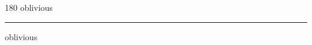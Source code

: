 
\begin{frame}
\begin{center}
\begin{turn}{180}
{\fontsize{2.5cm}{1em}\selectfont oblivious}
\end{turn}
\vspace{1em}\par  
\hrule
\vspace{1em}\par  
{\fontsize{2.5cm}{1em}\selectfont oblivious}
\end{center}
\end{frame}
